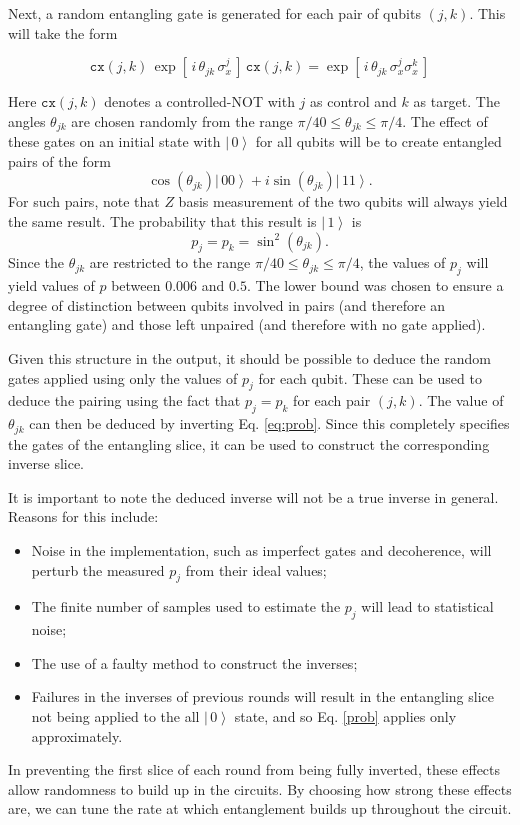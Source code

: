 \documentclass[aps,prl,twocolumn,showpacs,preprintnumbers]{revtex4-1}
\newcommand{\be}{\begin{equation}}
\newcommand{\ee}{\end{equation}}
\newcommand{\ket}[1]{\left | \, #1 \right\rangle}
\begin{document}
Next, a random entangling gate is generated for each pair of qubits $(j,k)$. This will take the form

\be
\mathtt{cx} (j,k) \, \exp [ \, i \, \theta_{jk} \, \sigma^j_x \, ] \, \mathtt{cx}(j,k) = \exp [ \, i \, \theta_{jk} \, \sigma^j_x \sigma^k_x \, ]
\ee

Here $\mathtt{cx}(j,k)$ denotes a controlled-NOT with $j$ as control and $k$ as target. The angles $\theta_{jk}$ are chosen randomly from the range $\pi/40 \leq \theta_{jk} \leq \pi/4$. The effect of these gates on an initial state with $\ket{0}$ for all qubits will be to create entangled pairs of the form
\be \label{state}
\cos (\theta_{jk}) \ket{00} + i \sin (\theta_{jk}) \ket{11} .
\ee
For such pairs, note that $Z$ basis measurement of the two qubits will always yield the same result. The probability that this result is $\ket{1}$ is
\be \label{eq:prob}
p_j = p_k = \sin^2 (\theta_{jk}).
\ee
Since the $\theta_{jk}$ are restricted to the range $\pi/40 \leq \theta_{jk} \leq \pi/4$, the values of $p_j$ will yield values of $p$ between $0.006$ and $0.5$. The lower bound was chosen to ensure a degree of distinction between qubits involved in pairs (and therefore an entangling gate) and those left unpaired (and therefore with no gate applied).

Given this structure in the output, it should be possible to deduce the random gates applied using only the values of $p_j$ for each qubit. These can be used to deduce the pairing using the fact that $p_j=p_k$ for each pair $(j,k)$. The value of $\theta_{jk}$ can then be deduced by inverting Eq. \ref{eq:prob}. Since this completely specifies the gates of the entangling slice, it can be used to construct the corresponding inverse slice.

It is important to note the deduced inverse will not be a true inverse in general. Reasons for this include:
\begin{itemize}
\item Noise in the implementation, such as imperfect gates and decoherence, will perturb the measured $p_j$ from their ideal values;
\item The finite number of samples used to estimate the $p_j$ will lead to statistical noise;
\item The use of a faulty method to construct the inverses;
\item Failures in the inverses of previous rounds will result in the entangling slice not being applied to the all $\ket{0}$ state, and so Eq. \ref{prob} applies only approximately.
\end{itemize}
In preventing the first slice of each round from being fully inverted, these effects allow randomness to build up in the circuits. By choosing how strong these effects are, we can tune the rate at which entanglement builds up throughout the circuit.
\end{document}
